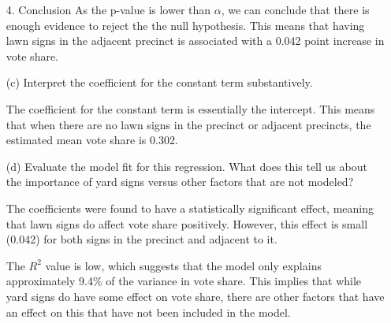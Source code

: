 \documentclass[12pt,letterpaper]{article}
\begin{document}
\begin{enumerate}
	4. Conclusion
	As the p-value is lower than $\alpha$, we can conclude that there is enough evidence to reject the the null hypothesis. This means that having lawn signs in the adjacent precinct is associated with a 0.042 point increase in vote share.
	 
	\item [(c)] Interpret the coefficient for the constant term substantively.

	The coefficient for the constant term is essentially the intercept. This means that when there are no lawn signs in the precinct or adjacent precincts, the estimated mean vote share is 0.302.
	
	\newpage
	\item [(d)] Evaluate the model fit for this regression.  What does this	tell us about the importance of yard signs versus other factors that are not modeled?
	
	The coefficients were found to have a statistically significant effect, meaning that lawn signs do affect vote share positively. However, this effect is small (0.042) for both signs in the precinct and adjacent to it.
	
	The $R^2$ value is low, which suggests that the model only explains approximately 9.4\% of the variance in vote share. This implies that while yard signs do have some effect on vote share, there are other factors that have an effect on this that have not been included in the model.
	
\end{enumerate}  
\end{document}
